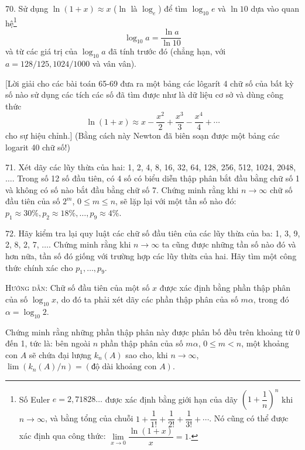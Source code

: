 \begin{problem}{70.}
	Sử dụng $\ln(1+x)\approx x$ ($\ln$ là $\log_e$) để tìm $\log_{10}e$ và $\ln 10$ dựa vào quan hệ\footnote{Số Euler $e=2,71828\ldots$ được xác định bằng giới hạn của dãy $\left(1+\dfrac{1}{n}\right)^n$ khi $n\rightarrow \infty$, và bằng tổng của chuỗi $1+\dfrac{1}{1!}+\dfrac{1}{2!}+\dfrac{1}{3!}+\cdots$. Nó cũng có thể được xác định qua công thức: $\lim\limits_{x\rightarrow 0}\dfrac{\ln(1+x)}{x}=1$.}
	$$\log_{10}a=\dfrac{\ln a}{\ln 10}$$
	và từ các giá trị của $\log_{10}a$ đã tính trước đó (chẳng hạn, với $a=128/125, 1024/1000$ và vân vân).

	[Lời giải cho các bài toán 65-69 đưa ra một bảng các lôgarít 4 chữ số của bất kỳ số nào sử dụng các tích các số đã tìm được như là dữ liệu cơ sở và  dùng công thức $$\ln(1+x)\approx x-\dfrac{x^2}{2}+\dfrac{x^3}{3}-\dfrac{x^4}{4}+\cdots$$ cho sự hiệu chỉnh.] (Bằng cách này Newton đã biên soạn được một bảng các logarit 40 chữ số!)
\end{problem}

\begin{problem}{71.}
	Xét dãy các lũy thừa của hai: 1, 2, 4, 8, 16, 32, 64, 128, 256, 512, 1024, 2048, $\ldots$. Trong số 12 số đầu tiên, có 4 số có biểu diễn thập phân bắt đầu bằng chữ số 1 và không có số nào bắt đầu bằng chữ số 7. Chứng minh rằng khi $n\rightarrow \infty$ chữ số đầu tiên của số $2^m$, $0\leq m\leq n$, sẽ lặp lại với một tần số nào đó: 
$p_1\approx 30\%, p_2\approx 18\%, \ldots, p_9 \approx 4\%$.
\end{problem}

\begin{problem}{72.}
	Hãy kiểm tra lại quy luật các chữ số đầu tiên của các lũy thừa của ba: 1, 3, 9, 2, 8, 2,  7, $\ldots$. Chứng minh rằng khi $n\rightarrow \infty$ ta cũng được những tần số nào đó và hơn nữa, tần số đó giống với trường hợp các lũy thừa của hai. Hãy tìm một công thức chính xác cho $p_1,\ldots, p_9$.

	\textsc{Hướng dẫn}: Chữ số đầu tiên của một số $x$ được xác định bằng phần thập phân của số $\log_{10}x$, do đó ta phải xét dãy các phần thập phân của số $m\alpha$, trong đó $\alpha=\log_{10}2$.

	Chứng minh rằng những phần thập phân này được phân bố đều trên khoảng từ 0 đến 1, tức là: bên ngoài $n$ phần thập phân của số $m\alpha$, $0\leq m<n$, một khoảng con $A$ sẽ chứa đại lượng $k_n(A)$ sao cho, khi $n\rightarrow \infty$, $\lim(k_n(A)/n)=(\mbox{độ dài khoảng con } A)$.
\end{problem}

